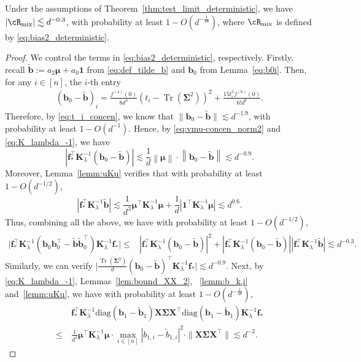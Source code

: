 \documentclass[twoside,11pt]{article}
\newcommand{\norm}[1]{\left\|#1\right\|}
\newcommand{\diag}{\text{diag}}
\newcommand{\ones}{\mathbf{1}}
\def\vf{{\boldsymbol f}}
\def\bK{{\boldsymbol K}}
\def\bX{{\boldsymbol X}}
\def\bb{{\boldsymbol b}}
\def\bSigma{{\boldsymbol \Sigma}}
\renewcommand{\bK}{\boldsymbol{K}}
\newcommand{\Tr}{\operatorname{Tr}}
\newcommand{\vmu}{\mbi{\mu}}
\newcommand{\mix}{\textnormal{mix}}
\newcommand{\1}{\mathbf{1}}
\def\mbi#1{\boldsymbol{#1}}
\def\mbi#1{\boldsymbol{#1}} %
\begin{document}
\begin{lemma}\label{lemm:bias3_deterministic}
Under the assumptions of Theorem~\ref{thm:test_limit_deterministic}, we have
    $|\cR_{\mix}|\lesssim d^{-0.3}$,
    with probability at least $1-O(d^{-\frac{1}{48}})$,
    where 
  $\cR_{\mix}$ is defined  by \eqref{eq:bias2_deterministic}.
\end{lemma}
\begin{proof}
We control the terms in \eqref{eq:bias2_deterministic}, respectively. Firstly, recall $\widetilde\bb:=a_2\vmu+a_0\1$ from \eqref{eq:def_tilde_b} and $\bb_0$ from Lemma~\ref{eq:b0i}. Then, for any $i\in [n]$, the $i$-th entry 
\begin{align}
   ( \bb_0-\widetilde\bb)_i= \frac{f^{(4)}(0)}{8d^4}(t_i-\Tr(\bSigma^2))^2+\frac{15t_i^3f^{(6)}(0)}{6!d^6}.
\end{align}Therefore, by \eqref{eq:t_i_concen}, we know that
$\| \bb_0-\widetilde\bb\|\lesssim d^{-1.9}$, with probability at least $1-O(d^{-1})$. Hence, by \eqref{eq:vmu-concen_norm2} and \eqref{eq:K_lambda_-1}, we have 
  $$  |\vf_*^\top \bK_{\lambda}^{-1}(\bb_0-\widetilde\bb)|\lesssim \frac{1}{d}\norm{\vmu}\cdot\norm{\bb_0-\widetilde\bb}\lesssim d^{-0.9}.$$
Moreover, Lemma~\ref{lemm:uKu} verifies that with probability at least $1-O(d^{-1/2})$,
 $$ |\vf_*^\top \bK_{\lambda}^{-1} \widetilde\bb |\lesssim \frac{1}{d^3}\vmu^\top \bK_{\lambda}^{-1}\vmu+\frac{1}{d}|\ones^\top \bK_{\lambda}^{-1} \vmu|\lesssim  d^{0.6}.$$
Thus, combining all the above, we have with probability at least $1-O(d^{-1/2})$,
\begin{align}
   \big|\vf_*^\top \bK_{\lambda}^{-1}(\bb_0\bb_0^\top-\widetilde\bb\widetilde\bb_0^\top)\bK_{\lambda}^{-1} \vf_*\big|
   \le& |\vf_*^\top \bK_{\lambda}^{-1}(\bb_0-\widetilde\bb)|^2+|\vf_*^\top \bK_{\lambda}^{-1}(\bb_0-\widetilde\bb)||\vf_*^\top \bK_{\lambda}^{-1} \widetilde\bb |\lesssim d^{-0.3}.
\end{align} 
Similarly, we can verify
$\big|\frac{\Tr( \bSigma^2)}{d}(\bb_0-\widetilde\bb )^\top\bK_{\lambda}^{-1} \vf_*\big|\lesssim d^{-0.9}$.
Next, by \eqref{eq:K_lambda_-1}, Lemmas~\ref{lem:bound_XX_2}, ~\ref{lemm:b_k,i} and~\ref{lemm:uKu}, we have with probability at least $1-O(d^{-\frac{1}{48}})$,
\begin{align}
    &\vf_*^\top \bK_{\lambda}^{-1}\diag(\bb_1-\widetilde\bb_1)\bX\bSigma\bX^\top\diag(\bb_1-\widetilde\bb_1)\bK_{\lambda}^{-1} \vf_*\\
    \le~& \frac{1}{d^2}\vmu^\top\bK_{\lambda}^{-1}\vmu\cdot\max_{i\in[n]}|b_{1,i}-\widetilde b_{1,i}|^2\cdot \|\bX\bSigma\bX^\top\|\lesssim d^{-2}.

\end{align}
\end{proof}
\end{document}

